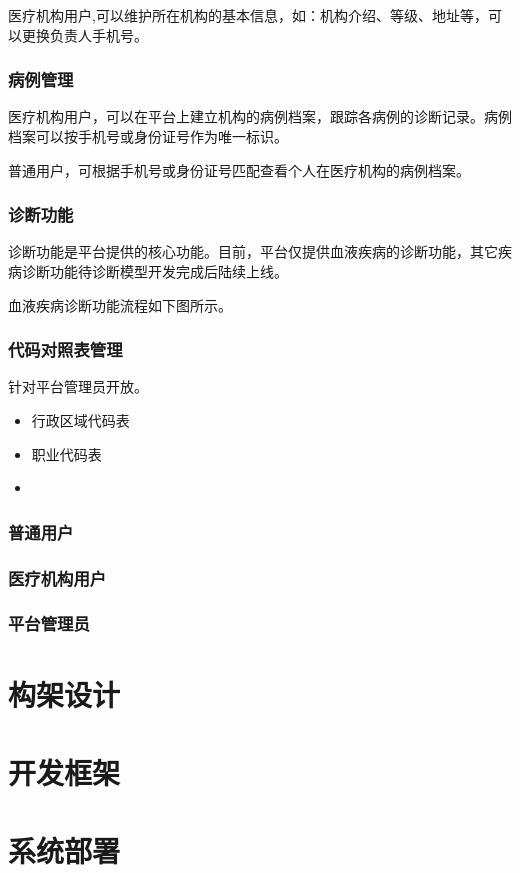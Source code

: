 \documentclass[UTF8,a4paper,12pt, onecolumn]{ctexart}
\begin{document}
医疗机构用户,可以维护所在机构的基本信息，如：机构介绍、等级、地址等，可以更换负责人手机号。

\subsubsection{病例管理}

医疗机构用户，可以在平台上建立机构的病例档案，跟踪各病例的诊断记录。病例档案可以按手机号或身份证号作为唯一标识。

普通用户，可根据手机号或身份证号匹配查看个人在医疗机构的病例档案。

\subsubsection{诊断功能}

诊断功能是平台提供的核心功能。目前，平台仅提供血液疾病的诊断功能，其它疾病诊断功能待诊断模型开发完成后陆续上线。

血液疾病诊断功能流程如下图所示。

\subsubsection{代码对照表管理}

针对平台管理员开放。

\begin{itemize}
  \item 行政区域代码表
  \item 职业代码表
  \item 
\end{itemize}


\subsubsection{普通用户}



\subsubsection{医疗机构用户}

\subsubsection{平台管理员}

\section{构架设计}



\section{开发框架}



\section{系统部署}


%

\appendix
\end{document}
